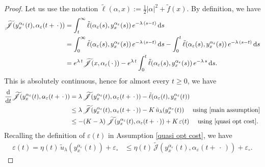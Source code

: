\documentclass[12pt]{amsart}
\newcommand{\D}[1]{\mbox{\rm #1}}
\newcommand{\dd}{\D{d}}
\numberwithin{equation}{section}
\theoremstyle{plain}
\begin{document}
\begin{proof}
Let us use the notation $\tilde{\ell}(\alpha,x) := \frac{1}{2}|\alpha|^{2} + \tilde{f}(x)$. By definition, we have
\begin{equation*}
\begin{aligned}
    \widetilde{\mathscr{J}}(y_{x}^{\alpha_{\varepsilon}}(t),\alpha_{\varepsilon}(t+\,\cdot\,))
    & = \int_{t}^{\infty} \tilde{\ell}(\alpha_{\varepsilon}(s),y_{x}^{\alpha_{\varepsilon}}(s))\,e^{-\lambda\,(s-t)}\,\dd s\\
    & = \int_{0}^{\infty} \tilde{\ell}(\alpha_{\varepsilon}(s),y_{x}^{\alpha_{\varepsilon}}(s))\,e^{-\lambda\,(s-t)}\,\dd s - \int_{0}^{t} \tilde{\ell}(\alpha_{\varepsilon}(s),y_{x}^{\alpha_{\varepsilon}}(s))\,e^{-\lambda\,(s-t)}\,\dd s\\
    & = e^{\lambda\,t}\widetilde{\mathscr{J}}(x,\alpha_{\varepsilon}(\,\cdot\,))- e^{\lambda\,t}\int_{0}^{t} \tilde{\ell}(\alpha_{\varepsilon}(s),y_{x}^{\alpha_{\varepsilon}}(s))\,e^{-\lambda\,s}\,\dd s.
\end{aligned}
\end{equation*}
This is absolutely continuous, hence for almost every $t\geq 0$, we have
\begin{equation}\label{eq: ineq J in proof 1}
\begin{aligned}
    \frac{\dd }{\dd t} \widetilde{\mathscr{J}}(y_{x}^{\alpha_{\varepsilon}}(t),\alpha_{\varepsilon}(t+\,\cdot\,))
    & = \lambda \,\widetilde{\mathscr{J}}(y_{x}^{\alpha_{\varepsilon}}(t),\alpha_{\varepsilon}(t+\,\cdot\,))  - \tilde{\ell}(\alpha_{\varepsilon}(t),y_{x}^{\alpha_{\varepsilon}}(t))\\
    & \leq \lambda \,\widetilde{\mathscr{J}}(y_{x}^{\alpha_{\varepsilon}}(t),\alpha_{\varepsilon}(t+\,\cdot\,)) - K\,\tilde{u}_{\lambda}(y_{x}^{\alpha_{\varepsilon}}(t)) \quad \text{ using } \ref{main assumption}\\
    & \leq -(K-\lambda) \,\widetilde{\mathscr{J}}(y_{x}^{\alpha_{\varepsilon}}(t),\alpha_{\varepsilon}(t+\,\cdot\,)) + K\,\varepsilon(t) \quad \text{ using } \ref{quasi opt cost}.
\end{aligned}
\end{equation}
Recalling the definition of $\varepsilon(t)$ in Assumption \ref{quasi opt cost}, we have
\begin{equation}\label{epsilon in proof}
\begin{aligned}
    \varepsilon(t) 
    = \eta(t)\,\tilde{u}_{\lambda}(y_{x}^{\alpha_{\varepsilon}}(t)) + \varepsilon_{\circ}
    & \leq \eta(t)\,\widetilde{\mathscr{J}}(y_{x}^{\alpha_{\varepsilon}}(t),\alpha_{\varepsilon}(t+\,\cdot\,)) + \varepsilon_{\circ}.

\end{aligned}
\end{equation}
\end{proof}
\end{document}
